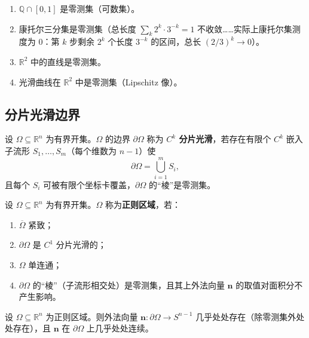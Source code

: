 \begin{example}[零测集的实例]\label{ex:null_set_examples}
\begin{enumerate}[label=(\roman*)]
    \item $\mathbb{Q} \cap [0, 1]$ 是零测集（可数集）。
    \item 康托尔三分集是零测集（总长度 $\sum_k 2^k \cdot 3^{-k} = 1$ 不收敛……实际上康托尔集测度为 $0$：第 $k$ 步剩余 $2^k$ 个长度 $3^{-k}$ 的区间，总长 $(2/3)^k \to 0$）。
    \item $\mathbb{R}^2$ 中的直线是零测集。
    \item 光滑曲线在 $\mathbb{R}^2$ 中是零测集（Lipschitz 像）。
\end{enumerate}
\end{example}

\subsection{分片光滑边界}

\begin{definition}[$C^k$ 分片光滑边界]\label{def:piecewise_smooth_boundary}
设 $\Omega \subseteq \mathbb{R}^n$ 为有界开集。$\Omega$ 的边界 $\partial \Omega$ 称为 \textbf{$C^k$ 分片光滑}，若存在有限个 $C^k$ 嵌入子流形 $S_1, \dots, S_m$（每个维数为 $n-1$）使
\[
\partial \Omega = \bigcup_{i=1}^{m} S_i,
\]
且每个 $S_i$ 可被有限个坐标卡覆盖，$\partial \Omega$ 的“棱”是零测集。
\end{definition}

\begin{definition}[正则区域]\label{def:regular_domain}
设 $\Omega \subseteq \mathbb{R}^n$ 为有界开集。$\Omega$ 称为\textbf{正则区域}，若：
\begin{enumerate}[label=(\roman*)]
    \item $\overline{\Omega}$ 紧致；
    \item $\partial \Omega$ 是 $C^1$ 分片光滑的；
    \item $\Omega$ 单连通；
    \item $\partial \Omega$ 的“棱”（子流形相交处）是零测集，且其上外法向量 $\mathbf{n}$ 的取值对面积分不产生影响。
\end{enumerate}
\end{definition}

\begin{proposition}[正则区域的外法向量几乎处处存在]\label{prop:regular_domain_normal}
设 $\Omega \subseteq \mathbb{R}^n$ 为正则区域。则外法向量 $\mathbf{n}: \partial \Omega \to S^{n-1}$ 几乎处处存在（除零测集外处处存在），且 $\mathbf{n}$ 在 $\partial \Omega$ 上几乎处处连续。
\end{proposition}

